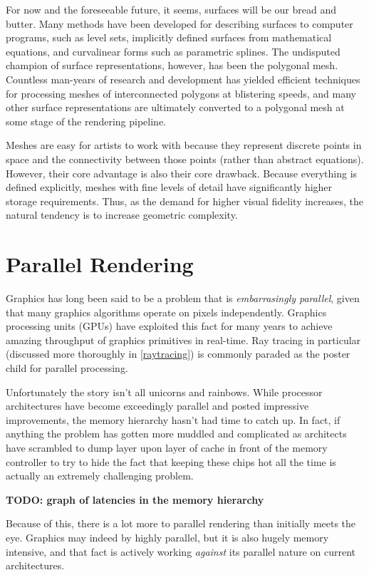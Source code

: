\documentclass[12pt]{ucthesis}
\begin{document}
For now and the foreseeable future, it seems, surfaces will be our bread and
butter. Many methods have been developed for describing surfaces to computer
programs, such as level sets, implicitly defined surfaces from mathematical
equations, and curvalinear forms such as parametric splines. The undisputed
champion of surface representations, however, has been the polygonal mesh.
Countless man-years of research and development has yielded efficient
techniques for processing meshes of interconnected polygons at blistering
speeds, and many other surface representations are ultimately converted to a
polygonal mesh at some stage of the rendering pipeline.

Meshes are easy for artists to work with because they represent discrete
points in space and the connectivity between those points (rather than abstract
equations). However, their core advantage is also their core drawback. Because
everything is defined explicitly, meshes with fine levels of detail have
significantly higher storage requirements. Thus, as the demand for higher
visual fidelity increases, the natural tendency is to increase geometric
complexity.

\section{Parallel Rendering}
\label{parallel}

Graphics has long been said to be a problem that is \emph{embarrasingly parallel},
given that many graphics algorithms operate on pixels independently. Graphics
processing units (GPUs) have exploited this fact for many years to achieve
amazing throughput of graphics primitives in real-time. Ray tracing in
particular (discussed more thoroughly in \ref{raytracing}) is commonly
paraded as the poster child for parallel processing.

Unfortunately the story isn't all unicorns and rainbows. While processor
architectures have become exceedingly parallel and posted impressive
improvements, the memory hierarchy hasn't had time to catch up. In fact,
if anything the problem has gotten more muddled and complicated as architects
have scrambled to dump layer upon layer of cache in front of the memory
controller to try to hide the fact that keeping these chips hot all the time is
actually an extremely challenging problem.

\textbf{TODO: graph of latencies in the memory hierarchy}

Because of this, there is a lot more to parallel rendering than initially meets
the eye. Graphics may indeed by highly parallel, but it is also hugely memory
intensive, and that fact is actively working \emph{against} its parallel
nature on current architectures.
\end{document}
